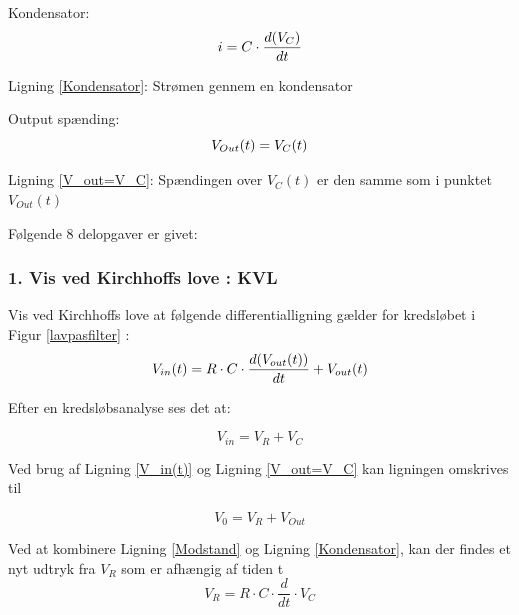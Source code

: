 Kondensator:
\begin{equation}
 i =C\cdot \frac{d(V_{C})}{dt}
\label{Kondensator}\\
\end{equation}
\begin{center}
Ligning \ref{Kondensator}: Strømen gennem en kondensator
\end{center}

Output spænding:
\begin{equation}
V_{Out}(t) = V_{C}(t)
\label{V_out=V_C}\\
\end{equation}
\begin{center}
Ligning \ref{V_out=V_C}: Spændingen over $V_ {C}(t)$ er den samme som i punktet $V_{Out}(t)$
\end{center}




Følgende 8 delopgaver er givet:
\subsubsection*{1. Vis ved Kirchhoffs love : KVL}
Vis ved Kirchhoffs love at følgende differentialligning gælder for kredsløbet i Figur \ref{lavpasfilter} : 
\begin{equation}
V_{in}(t)= R \cdot C \cdot \frac{d(V_{out}(t))}{dt} + V_{out}(t)
\label{dfLigning}\\
\end{equation}

Efter en kredsløbsanalyse ses det at:
\begin{center}
\begin{equation}
V_{in}=V_{R}+V_{C}
\label{V_in:KVL}
\end{equation}
\end{center}
 
 Ved brug af Ligning \ref{V_in(t)} og Ligning \ref{V_out=V_C}  kan ligningen omskrives til 
 \begin{center}
\begin{equation}
V_{0}=V_{R}+V_{Out}
\label{V_0:KVL}
\end{equation}
\end{center}

Ved at kombinere Ligning \ref{Modstand} og Ligning \ref{Kondensator}, kan der findes et nyt udtryk fra $V_{R}$ som er afhængig af tiden t
\begin{equation}
	V_{R} = R\cdot C\cdot \dfrac{d}{dt}\cdot V_{C}
\end{equation}

